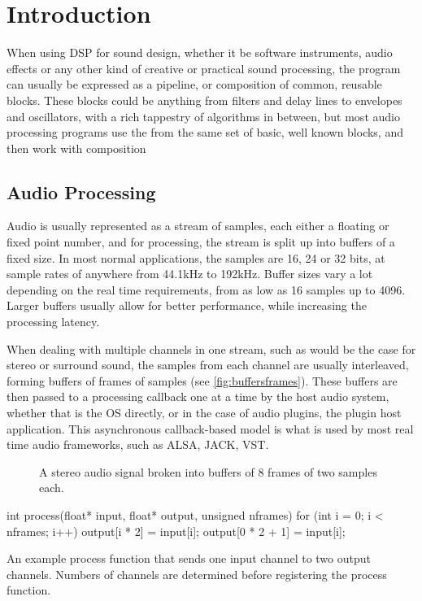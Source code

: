 \chapter{Introduction}

When using DSP for sound design, whether it be software instruments, audio effects or any other kind of
creative or practical sound processing, the program can usually be expressed as a pipeline, or composition of
common, reusable blocks. These blocks could be anything from filters and delay lines to envelopes and
oscillators, with a rich tappestry of algorithms in between, but most audio processing programs use the from
the same set of basic, well known blocks, and then work with composition 

\section{Audio Processing}

Audio is usually represented as a stream of samples, each either a floating or fixed point number, and for
processing, the stream is split up into buffers of a fixed size. In most normal applications, the samples are
16, 24 or 32 bits, at sample rates of anywhere from 44.1kHz to 192kHz. Buffer sizes vary a lot depending on
the real time requirements, from as low as 16 samples up to 4096. Larger buffers usually allow for better
performance, while increasing the processing latency.

When dealing with multiple channels in one stream, such as would be the case for stereo or surround sound,
the samples from each channel are usually interleaved, forming buffers of frames of samples (see
\autoref{fig:buffersframes}). These buffers are then passed to a processing callback one at a time by the host
audio system, whether that is the OS directly, or in the case of audio plugins, the plugin host application.
This asynchronous callback-based model is what is used by most real time audio frameworks, such as ALSA,
JACK, VST.

\begin{figure}
  
  \caption{A stereo audio signal broken into buffers of 8 frames of two samples each.}
  \label{fig:buffersframes}
\end{figure}

\begin{listing}[H]
  \begin{cppcodenl}
  int process(float* input, float* output, unsigned nframes) {
    for (int i = 0; i < nframes; i++) {
      output[i * 2] = input[i];
      output[0 * 2 + 1] = input[i];
    }
  }
  \end{cppcodenl}
  \label{lst:jackmerge}
  \caption{An example process function that sends one input channel to two output channels. Numbers of channels are
    determined before registering the process function.
  }
\end{listing}

